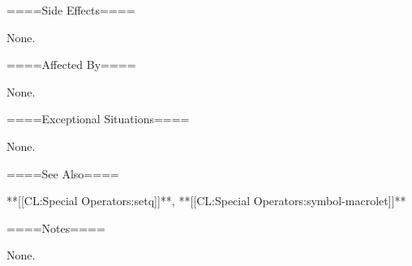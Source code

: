 ====Side Effects====

None.

====Affected By====

None.

====Exceptional Situations====

None.

====See Also====

**[[CL:Special Operators:setq]]**, **[[CL:Special Operators:symbol-macrolet]]**

====Notes====

None.

 
